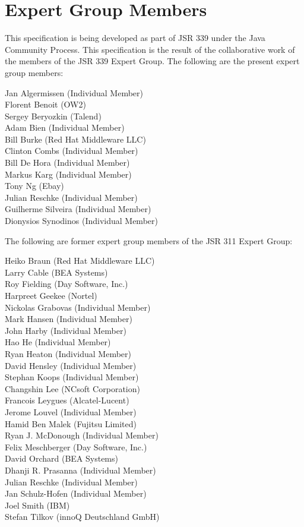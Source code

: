 \section{Expert Group Members} 
\label{expert_group}

This specification is being developed as part of JSR 339 under the Java Community Process. This specification is the result of the collaborative work of the members of the JSR 339 Expert Group. The following are the present expert group members:

Jan Algermissen (Individual Member) \\
Florent Benoit (OW2) \\
Sergey Beryozkin (Talend) \\
Adam Bien (Individual Member) \\
Bill Burke (Red Hat Middleware LLC) \\
Clinton Combs (Individual Member) \\
Bill De Hora (Individual Member) \\ 
Markus Karg (Individual Member) \\
Tony Ng (Ebay) \\
Julian Reschke (Individual Member) \\
Guilherme Silveira (Individual Member) \\
Dionysios Synodinos (Individual Member)

The following are former expert group members of the JSR 311 Expert Group:

Heiko Braun (Red Hat Middleware LLC) \\
Larry Cable (BEA Systems) \\
Roy Fielding (Day Software, Inc.) \\
Harpreet Geekee (Nortel) \\
Nickolas Grabovas (Individual Member) \\
Mark Hansen (Individual Member) \\
John Harby (Individual Member) \\
Hao He (Individual Member) \\
Ryan Heaton (Individual Member) \\
David Hensley (Individual Member) \\
Stephan Koops (Individual Member) \\
Changshin Lee (NCsoft Corporation) \\
Francois Leygues (Alcatel-Lucent) \\
Jerome Louvel (Individual Member) \\
Hamid Ben Malek (Fujitsu Limited) \\
Ryan J. McDonough (Individual Member) \\
Felix Meschberger (Day Software, Inc.) \\
David Orchard (BEA Systems) \\
Dhanji R. Prasanna (Individual Member) \\
Julian Reschke (Individual Member) \\
Jan Schulz-Hofen (Individual Member) \\
Joel Smith (IBM) \\
Stefan Tilkov (innoQ Deutschland GmbH)

